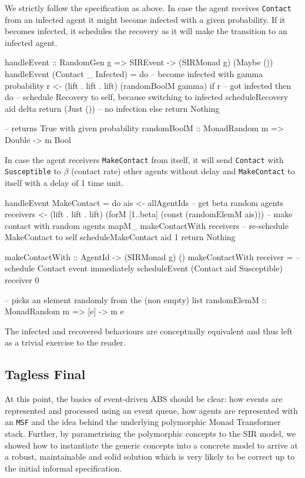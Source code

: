 We strictly follow the specification as above. In case the agent receives \texttt{Contact} from an infected agent it might become infected with a given probability. If it becomes infected, it schedules the recovery as it will make the transition to an infected agent.

\begin{HaskellCode}
handleEvent :: RandomGen g => SIREvent -> (SIRMonad g) (Maybe ())
handleEvent (Contact _ Infected) = do
  -- become infected with gamma probability
  r <- (lift . lift . lift) (randomBoolM gamma)
  if r
    -- got infected 
    then do
      -- schedule Recovery to self, because switching to infected
      scheduleRecovery aid delta
      return (Just ())
    -- no infection
    else return Nothing

-- returns True with given probability
randomBoolM :: MonadRandom m => Double -> m Bool
\end{HaskellCode}

In case the agent receivers \texttt{MakeContact} from itself, it will send \texttt{Contact} with \texttt{Susceptible} to $\beta$ (contact rate) other agents without delay and \texttt{MakeContact} to itself with a delay of 1 time unit.

\begin{HaskellCode}
handleEvent MakeContact = do
  ais <- allAgentIds
  -- get beta random agents
  receivers <- (lift . lift . lift) (forM [1..beta] (const (randomElemM ais)))
  -- make contact with random agents
  mapM_ makeContactWith receivers
  -- re-schedule MakeContact to self
  scheduleMakeContact aid 1
  return Nothing
  
makeContactWith :: AgentId -> (SIRMonad g) ()
makeContactWith receiver = 
  -- schedule Contact event immediately
  scheduleEvent (Contact aid Susceptible) receiver 0

-- picks an element randomly from the (non empty) list
randomElemM :: MonadRandom m => [e] -> m e
\end{HaskellCode}

The infected and recovered behaviours are conceptually equivalent and thus left as a trivial exercise to the reader. 

\subsection{Tagless Final}
\label{sec:tagless_final}
At this point, the basics of event-driven ABS should be clear: how events are represented and processed using an event queue, how agents are represented with an \texttt{MSF} and the idea behind the underlying polymorphic Monad Transformer stack. Further, by parametrising the polymorphic concepts to the SIR model, we showed how to instantiate the generic concepts into a concrete model to arrive at a robust, maintainable and solid solution which is very likely to be correct up to the initial informal specification.

